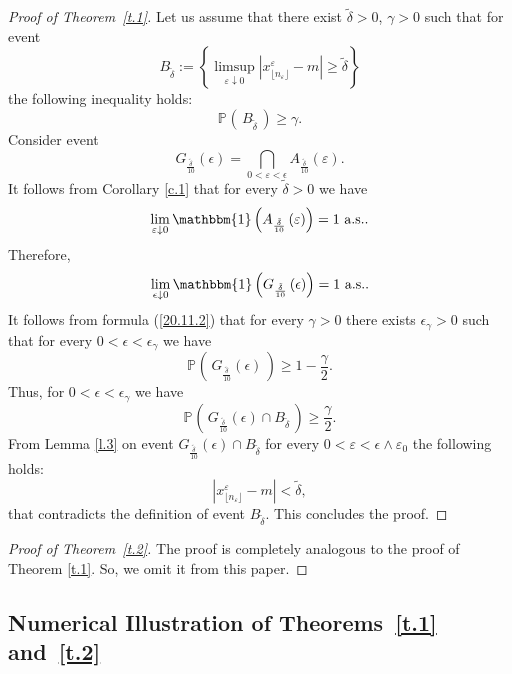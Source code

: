 \documentclass{article}
\theoremstyle{plain}
\theoremstyle{definition}
\theoremstyle{remark}
\newcommand{\p}[2][]{{\mathbb{P}}_{#1} \left( \, #2 \, \right) } %
\newcommand{\beq}{\begin{equation}}
\newcommand{\eeq}{\end{equation}}
\begin{document}
\begin{proof}[Proof of Theorem~\ref{t.1}]
Let us assume that there exist
$\tilde{\delta}>0$, $\gamma>0$ such that for event
$$
B_{\tilde{\delta}}:=\left\{\limsup\limits_{\varepsilon\downarrow 0}|x_{\lfloor n_\varepsilon \rfloor}^{\varepsilon}-m|\geq\tilde{\delta}\right\}
$$
the following inequality holds:
$$
\p{B_{\tilde{\delta}}}\geq\gamma.
$$
Consider event 
$$
G_{\frac{\tilde{\delta}}{10}}\left(\epsilon\right) = \bigcap_{0<\varepsilon < \epsilon} A_{\frac{\tilde{\delta}}{10}}\left(\varepsilon\right).
$$
It follows from Corollary \ref{c.1} that for every $\tilde{\delta} > 0$ we have
$$
\lim_{\varepsilon \downarrow 0} \mathbbm{1}\left(A_{\frac{\tilde{\delta}}{10}}\left(\varepsilon\right)\right) = 1 \text{ a.s.}.
$$
Therefore,
\beq\label{20.11.2}
\lim_{\epsilon \downarrow 0} \mathbbm{1}\left(G_{\frac{\tilde{\delta}}{10}}\left(\epsilon\right)\right) = 1 \text{ a.s.}.
\eeq
It follows from formula (\ref{20.11.2}) that for every $\gamma > 0$ there exists  $\epsilon_\gamma>0$ such that for every $0<\epsilon<\epsilon_\gamma$ we have
$$
\p{G_{\frac{\tilde{\delta}}{10}}\left(\epsilon\right)}\geqslant 1-\frac{\gamma}{2}.
$$
Thus, for $0<\epsilon<\epsilon_\gamma$
we have
$$
\p{G_{\frac{\tilde{\delta}}{10}}\left(\epsilon\right)\cap B_{\tilde{\delta}}}\geq\frac{\gamma}{2}.
$$
From Lemma \ref{l.3} on event $G_{\frac{\tilde{\delta}}{10}}\left(\epsilon\right)\cap B_{\tilde{\delta}}$
for every $0<\varepsilon<\epsilon\wedge\varepsilon_0$ the following holds:
$$
|x_{\lfloor n_\varepsilon \rfloor}^{\varepsilon}-m|<\tilde{\delta},
$$
that contradicts the definition of event $B_{\tilde{\delta}}$. This concludes the proof. 
\end{proof}

\begin{proof}[Proof of Theorem~\ref{t.2}]
The proof is completely analogous to the proof of Theorem \ref{t.1}. So, we omit it from this paper.
\end{proof}


\subsection{Numerical Illustration of Theorems~\ref{t.1} and~\ref{t.2}}\label{sec_additional_sim_for_part_A}
\end{document}
